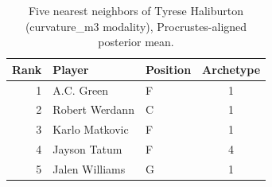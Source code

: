\begin{table}[htbp]
  \centering\small
  \begin{tabular}{rllc}
    \toprule
    Rank & Player & Position & Archetype \\
    \midrule
    1 & A.C. Green & F & 1 \\
    2 & Robert Werdann & C & 1 \\
    3 & Karlo Matkovic & F & 1 \\
    4 & Jayson Tatum & F & 4 \\
    5 & Jalen Williams & G & 1 \\
    \bottomrule
  \end{tabular}
  \caption{Five nearest neighbors of Tyrese Haliburton (curvature_m3 modality), Procrustes-aligned posterior mean.}
  \label{tab:Tyrese_Haliburton_neighbors_curvature_m3}
\end{table}

